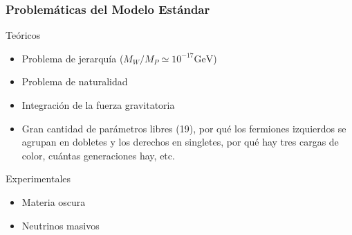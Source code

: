 \documentclass[10pt, compress,spanish]{beamer}
\begin{document}
\begin{frame}[fragile]

\frametitle{Problemáticas del Modelo Estándar}

\normalsize

\begin{block}{Teóricos}
\begin{itemize}

  \item Problema de jerarquía ($M_{W}/M_{P} \simeq 10^{-17} \text{GeV}$)

  \item Problema de naturalidad

  \item Integración de la fuerza gravitatoria

  \item Gran cantidad de parámetros libres (19), por qué los fermiones izquierdos se agrupan en dobletes y los derechos en singletes, por qué hay tres cargas de color, cuántas generaciones hay, etc.

\end{itemize}
\end{block}

\begin{block}{Experimentales}
\begin{itemize}

  \item Materia oscura

  \item Neutrinos masivos

\end{itemize}
\end{block}

\end{frame}




\end{document}
